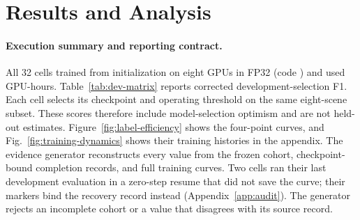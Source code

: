 \section{Results and Analysis}
\label{sec:results}

\paragraph{Execution summary and reporting contract.}

All 32 cells trained from initialization on eight \HevHardware{} GPUs in
FP32 (code \texttt{\HevCodeSHAShort}) and used \HevGPUHours{} GPU-hours.
Table~\ref{tab:dev-matrix} reports corrected
development-selection F1. Each cell selects its checkpoint and operating
threshold on the same eight-scene subset. These scores therefore include
model-selection optimism and are not held-out estimates.
Figure~\ref{fig:label-efficiency} shows the four-point curves, and
Fig.~\ref{fig:training-dynamics} shows their training histories in the
appendix. The evidence generator reconstructs every value from the frozen
cohort, checkpoint-bound completion records, and full training curves. Two
cells ran their last development evaluation in a zero-step resume that did
not save the curve; their markers bind the recovery record instead
(Appendix~\ref{app:audit}). The generator rejects an incomplete cohort or a
value that disagrees with its source record.

